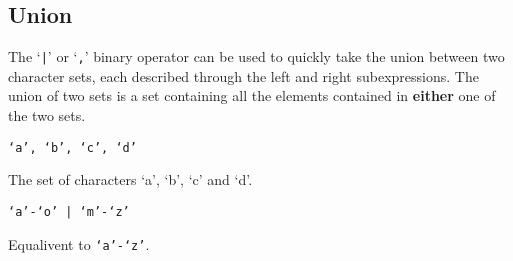 
\subsection{Union}
{
	The `\texttt{|}' or `\texttt{,}' binary operator can be used to
	quickly take the union between two character sets, each described through
	the left and right subexpressions. The union of two sets is
	a set containing all the elements contained in \textbf{either} one of the
	two sets.
	
	\begin{itemize}
	{
		\item \texttt{`a', `b', `c', `d'}
		
			The set of characters `a', `b', `c' and `d'.
		
		\item \texttt{`a'-`o' | `m'-`z'}
		
			Equalivent to \texttt{`a'-`z'}.
	}
	\end{itemize}
}
